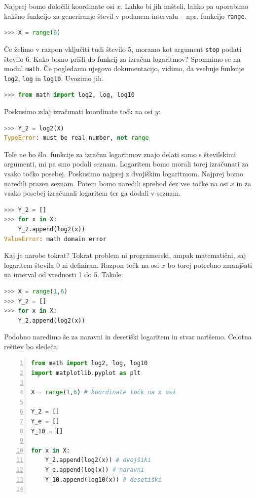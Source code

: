 \begin{resitev}
Najprej bomo določili koordinate osi $x$. Lahko bi jih našteli, lahko pa uporabimo kakšno funkcijo za generiranje števil v podanem intervalu -- npr. funkcijo \texttt{range}.
\begin{lstlisting}[language=Python]
>>> X = range(6)
\end{lstlisting}
Če želimo v razpon vključiti tudi število 5, moramo kot argument \texttt{stop} podati število 6. Kako bomo prišli do funkcij za izračun logaritmov? Spomnimo se na modul \texttt{math}. Če pogledamo njegovo dokumentacijo, vidimo, da vsebuje funkcije \texttt{log2}, \texttt{log} in \texttt{log10}. Uvozimo jih. 
\begin{lstlisting}[language=Python]
>>> from math import log2, log, log10
\end{lstlisting}
Poskusimo zdaj izračunati koordinate točk na osi $y$:
\begin{lstlisting}[language=Python]
>>> Y_2 = log2(X)
TypeError: must be real number, not range
\end{lstlisting}
Tole ne bo šlo. funkcije za izračun logaritmov znajo delati samo s številskimi argumenti, mi pa smo podali seznam. Logaritem bomo morali torej izračunati za vsako točko posebej. Poskusimo najprej z dvojiškim logaritmom. Najprej bomo naredili prazen seznam. Potem bomo naredili sprehod čez vse točke na osi $x$ in za vsako posebej izračunali logaritem ter ga dodali v seznam.
\begin{lstlisting}[language=Python]
>>> Y_2 = []
>>> for x in X:
    Y_2.append(log2(x))
ValueError: math domain error
\end{lstlisting}
Kaj je narobe tokrat? Tokrat problem ni programerski, ampak matematični, saj logaritem števila 0 ni definiran. Razpon točk na osi $x$ bo torej potrebno zmanjšati na interval od vrednosti 1 do 5. Takole:
\begin{lstlisting}[language=Python]
>>> X = range(1,6)
>>> Y_2 = []
>>> for x in X:
    Y_2.append(log2(x))
\end{lstlisting}
Podobno naredimo še za naravni in desetiški logaritem in stvar narišemo. Celotna rešitev bo sledeča:
\begin{lstlisting}[language=Python,numbers=left]
from math import log2, log, log10
import matplotlib.pyplot as plt

X = range(1,6) # koordinate točk na x osi

Y_2 = []
Y_e = []
Y_10 = []

for x in X:
    Y_2.append(log2(x)) # dvojšiki
    Y_e.append(log(x)) # naravni
    Y_10.append(log10(x)) # desetiški


\end{lstlisting}
\end{resitev}
